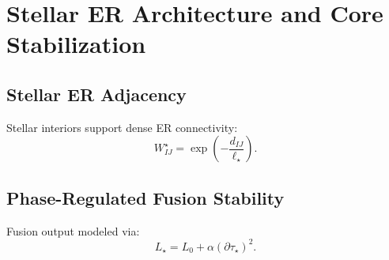 \chapter{Stellar ER Architecture and Core Stabilization}

\section{Stellar ER Adjacency}
Stellar interiors support dense ER connectivity:
\[
W_{IJ}^{\star} = \exp\!\left(-\frac{d_{IJ}}{\ell_\star}\right).
\]

\section{Phase-Regulated Fusion Stability}
Fusion output modeled via:
\[
L_\star = L_0 + \alpha (\partial\tau_\star)^2.
\]

